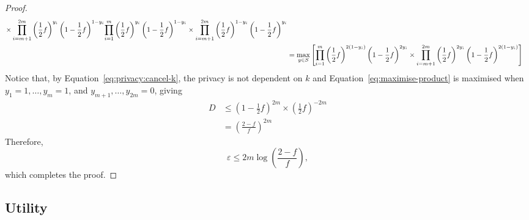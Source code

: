 \documentclass{article}
\begin{document}
\begin{proof}
\begin{align}
{				\times \prod\limits_{i=m+1}^{2m}\left(\frac{1}{2}f\right)^{y_i} \left(1-\frac{1}{2}f\right)^{1-y_i}%
			}{%
				\prod\limits_{i=1}^m \left(\frac{1}{2}f\right)^{y_i}\left(1-\frac{1}{2}f\right)^{1-y_i}%
				\times \prod\limits_{i=m+1}^{2m}\left(\frac{1}{2}f\right)^{1-y_i} \left(1-\frac{1}{2}f\right)^{y_i}%
			}\label{eq:privacy:cancel-k}\\
			&=\max_{y\in S}\left[%
				\prod\limits_{i=1}^m \left(\frac{1}{2}f\right)^{2(1-y_i)}\left(1-\frac{1}{2}f\right)^{2y_i}%
				\times \prod\limits_{i=m+1}^{2m}\left(\frac{1}{2}f\right)^{2y_i} \left(1-\frac{1}{2}f\right)^{2(1-y_i)}\right]\label{eq:maximise-product}%
	\end{align}
	Notice that, by Equation~\ref{eq:privacy:cancel-k}, the privacy is not dependent on $k$ and Equation~\ref{eq:maximise-product} is maximised when $y_1=1,\ldots,y_m=1$, and $y_{m+1},\ldots,y_{2m}=0$, giving
	\begin{align*}
		D &\leq \left(1-\frac{1}{2}f\right)^{2m}\times\left(\frac{1}{2}f\right)^{-2m}\\
			&= \left(\frac{2-f}{f}\right)^{2m}
	\end{align*}
	Therefore,
	\begin{equation}
		\varepsilon \leq 2m\log\left(\frac{2-f}{f}\right),
	\end{equation}
    which completes the proof.
\end{proof}

\subsection{Utility}
\end{document}
